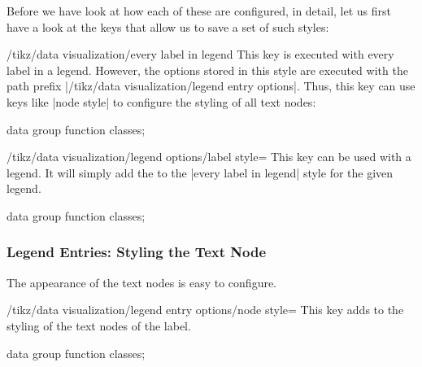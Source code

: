 Before we have look at how each of these are configured, in detail,
let us first have a look at the keys that allow us to save a set of
such styles:

\begin{stylekey}{/tikz/data visualization/every label in legend}
  This key is executed with every label in a legend. However, the
  options stored in this style are executed with the path prefix
  |/tikz/data visualization/legend entry options|. Thus, this key can
  use keys like |node style| to configure the styling of all text
  nodes: 
\begin{codeexample}[width=8cm]
\tikz \datavisualization [
  scientific axes,
  every label in legend/.style={node style=
    {fill=red!30}},
  visualize as smooth line/.list=
    {log, lin, squared, exp},
  legend=north east outside,
  log=    {label in legend={text=$\log x$}},
  lin=    {label in legend={text=$x/2$,
      node style={circle, draw=red}}},
  squared={label in legend={text=$x^2$}},
  exp=    {label in legend={text=$e^x$}},
  style sheet=strong colors]
data group {function classes};
\end{codeexample}
\end{stylekey}

\begin{key}{/tikz/data visualization/legend options/label style=}
  This key can be used with a legend. It will simply add the
   to the |every label in legend| style for the given
  legend. 
\begin{codeexample}[width=8cm]
\tikz \datavisualization [
  scientific axes,
  visualize as smooth line/.list=
    {log, lin, squared, exp},
  legend={label style={node style=draw}},
  log=    {label in legend={text=$\log x$}},
  lin=    {label in legend={text=$x/2$,
      node style={circle, draw=red}}},
  squared={label in legend={text=$x^2$}},
  exp=    {label in legend={text=$e^x$}},
  style sheet=strong colors]
data group {function classes};
\end{codeexample}
\end{key}


\subsubsection{Legend Entries: Styling the Text Node}

The appearance of the text nodes is easy to configure. 

\begin{key}{/tikz/data visualization/legend entry options/node style=}
  This key adds  to the styling of the text nodes of the
  label. 
\begin{codeexample}[width=8cm]
\tikz \datavisualization [
  scientific axes, 
  visualize as smooth line/.list=
    {log, lin, squared, exp},
  legend=north east outside,
  log=    {label in legend={text=$\log x$}},
  lin=    {label in legend={text=$x/2$,
      node style={circle, draw=red}}},
  squared={label in legend={text=$x^2$}},
  exp=    {label in legend={text=$e^x$}},
  style sheet=strong colors]
data group {function classes};
\end{codeexample}
\end{key}

